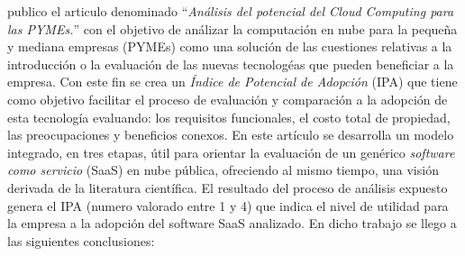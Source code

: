 \cite{ercolani} publico el articulo denominado ``\emph{An\'alisis del potencial del
Cloud Computing para las PYMEs.}'' con el objetivo de an\'alizar la computaci\'on en nube
para la peque\~na y mediana empresas (PYMEs) como una soluci\'on de las cuestiones relativas a la
introducci\'on o la evaluaci\'on de las nuevas tecnolog\'eas que pueden beneficiar a la empresa.
Con este fin se crea un \emph{\'Indice de Potencial de Adopci\'on} (IPA) que tiene
como objetivo facilitar el proceso de evaluaci\'on y comparaci\'on a la adopci\'on de
esta tecnolog\'ia evaluando: los requisitos funcionales, el costo total de propiedad,
las preocupaciones y beneficios conexos.
En este art\'iculo se desarrolla un modelo integrado, en tres etapas, \'util para
orientar la evaluaci\'on de un gen\'erico \emph{software como servicio} (SaaS) en nube
p\'ublica, ofreciendo al mismo tiempo, una visi\'on derivada de la literatura cient\'ifica.
El resultado del proceso de an\'alisis expuesto genera el IPA (numero valorado
entre 1 y 4) que indica el nivel de utilidad para la empresa a la adopci\'on del
software SaaS analizado. En dicho trabajo se llego a las siguientes conclusiones:
